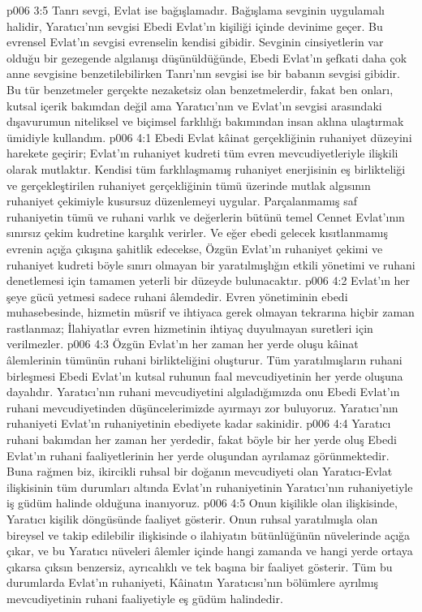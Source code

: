 \vs p006 3:5 Tanrı sevgi, Evlat ise bağışlamadır. Bağışlama sevginin uygulamalı halidir, Yaratıcı’nın sevgisi Ebedi Evlat’ın kişiliği içinde devinime geçer. Bu evrensel Evlat’ın sevgisi evrenselin kendisi gibidir. Sevginin cinsiyetlerin var olduğu bir gezegende algılanışı düşünüldüğünde, Ebedi Evlat’ın şefkati daha çok anne sevgisine benzetilebilirken Tanrı’nın sevgisi ise bir babanın sevgisi gibidir. Bu tür benzetmeler gerçekte nezaketsiz olan benzetmelerdir, fakat ben onları, kutsal içerik bakımdan değil ama Yaratıcı’nın ve Evlat’ın sevgisi arasındaki dışavurumun niteliksel ve biçimsel farklılığı bakımından insan aklına ulaştırmak ümidiyle kullandım.
\vs p006 4:1 Ebedi Evlat kâinat gerçekliğinin ruhaniyet düzeyini harekete geçirir; Evlat’ın ruhaniyet kudreti tüm evren mevcudiyetleriyle ilişkili olarak mutlaktır. Kendisi tüm farklılaşmamış ruhaniyet enerjisinin eş birlikteliği ve gerçekleştirilen ruhaniyet gerçekliğinin tümü üzerinde mutlak algısının ruhaniyet çekimiyle kusursuz düzenlemeyi uygular. Parçalanmamış saf ruhaniyetin tümü ve ruhani varlık ve değerlerin bütünü temel Cennet Evlat’ının sınırsız çekim kudretine karşılık verirler. Ve eğer ebedi gelecek kısıtlanmamış evrenin açığa çıkışına şahitlik edecekse, Özgün Evlat’ın ruhaniyet çekimi ve ruhaniyet kudreti böyle sınırı olmayan bir yaratılmışlığın etkili yönetimi ve ruhani denetlemesi için tamamen yeterli bir düzeyde bulunacaktır.
\vs p006 4:2 Evlat’ın her şeye gücü yetmesi sadece ruhani âlemdedir. Evren yönetiminin ebedi muhasebesinde, hizmetin müsrif ve ihtiyaca gerek olmayan tekrarına hiçbir zaman rastlanmaz; İlahiyatlar evren hizmetinin ihtiyaç duyulmayan suretleri için verilmezler.
\vs p006 4:3 Özgün Evlat’ın her zaman her yerde oluşu kâinat âlemlerinin tümünün ruhani birlikteliğini oluşturur. Tüm yaratılmışların ruhani birleşmesi Ebedi Evlat’ın kutsal ruhunun faal mevcudiyetinin her yerde oluşuna dayalıdır. Yaratıcı’nın ruhani mevcudiyetini algıladığımızda onu Ebedi Evlat’ın ruhani mevcudiyetinden düşüncelerimizde ayırmayı zor buluyoruz. Yaratıcı’nın ruhaniyeti Evlat’ın ruhaniyetinin ebediyete kadar sakinidir.
\vs p006 4:4 Yaratıcı ruhani bakımdan her zaman her yerdedir, fakat böyle bir her yerde oluş Ebedi Evlat’ın ruhani faaliyetlerinin her yerde oluşundan ayrılamaz görünmektedir. Buna rağmen biz, ikircikli ruhsal bir doğanın mevcudiyeti olan Yaratıcı\hyp{}Evlat ilişkisinin tüm durumları altında Evlat’ın ruhaniyetinin Yaratıcı’nın ruhaniyetiyle iş güdüm halinde olduğuna inanıyoruz.
\vs p006 4:5 Onun kişilikle olan ilişkisinde, Yaratıcı kişilik döngüsünde faaliyet gösterir. Onun ruhsal yaratılmışla olan bireysel ve takip edilebilir ilişkisinde o ilahiyatın bütünlüğünün nüvelerinde açığa çıkar, ve bu Yaratıcı nüveleri âlemler içinde hangi zamanda ve hangi yerde ortaya çıkarsa çıksın benzersiz, ayrıcalıklı ve tek başına bir faaliyet gösterir. Tüm bu durumlarda Evlat’ın ruhaniyeti, Kâinatın Yaratıcısı’nın bölümlere ayrılmış mevcudiyetinin ruhani faaliyetiyle eş güdüm halindedir.
